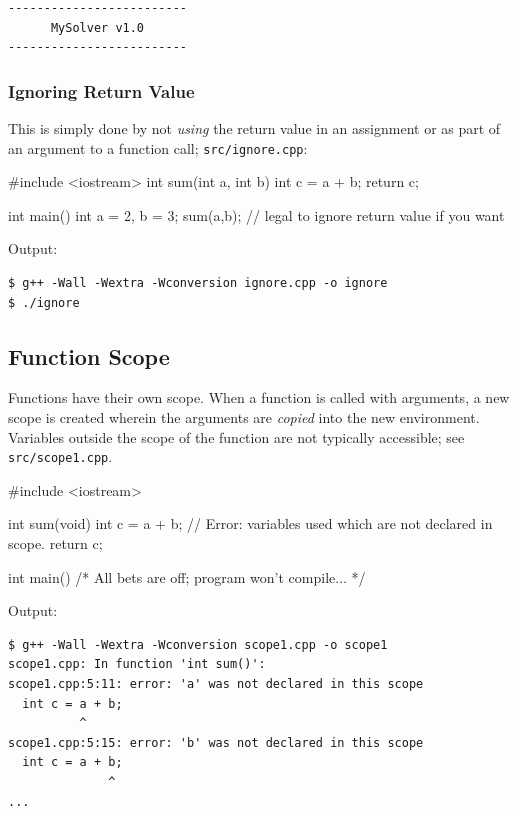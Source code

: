 \documentclass[12pt,letterpaper,twoside]{article}
\begin{document}
\begin{verbatim}
-------------------------
      MySolver v1.0      
-------------------------
\end{verbatim}

\subsubsection{Ignoring Return Value} This is simply done by not \emph{using} the return
value in an assignment or as part of an argument to a function call;
\texttt{src/ignore.cpp}:

\begin{cpp}
#include <iostream>
int sum(int a, int b) {
  int c = a + b;
  return c;
}

int main() {
  int a = 2, b = 3;
  sum(a,b); // legal to ignore return value if you want
}
\end{cpp}

Output:

\begin{verbatim}
$ g++ -Wall -Wextra -Wconversion ignore.cpp -o ignore
$ ./ignore
\end{verbatim}

\subsection{Function Scope} Functions have their own scope. When a function is called with
arguments, a new scope is created wherein the arguments are \emph{copied} into the new 
environment. Variables outside the scope of the function are not typically accessible; see
\texttt{src/scope1.cpp}.

\begin{cpp}
#include <iostream>

int sum(void) {
  int c = a + b;  // Error: variables used which are not declared in scope.
  return c;
}

int main() {  /* All bets are off; program won't compile... */ }
\end{cpp}

Output:

\begin{verbatim}
$ g++ -Wall -Wextra -Wconversion scope1.cpp -o scope1
scope1.cpp: In function 'int sum()':
scope1.cpp:5:11: error: 'a' was not declared in this scope
  int c = a + b;
          ^
scope1.cpp:5:15: error: 'b' was not declared in this scope
  int c = a + b;
              ^
...
\end{verbatim}
\end{document}

